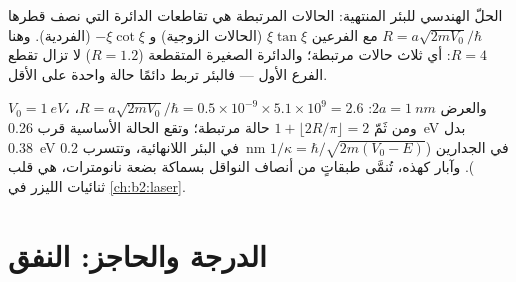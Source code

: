 \begin{omfigure}

{\small الحلّ الهندسي للبئر المنتهية: الحالات المرتبطة هي
تقاطعات الدائرة التي نصف قطرها $R = a\sqrt{2mV_0}/\hbar$ مع
الفرعين $\xi\tan\xi$ (الحالات الزوجية) و $-\xi\cot\xi$ (الفردية). وهنا
$R = 4$: أي ثلاث حالات مرتبطة؛ والدائرة الصغيرة المتقطعة ($R = 1.2$) لا تزال
تقطع الفرع الأول --- فالبئر تربط دائمًا حالة واحدة على الأقل.}
\end{omfigure}

\begin{example}\label{ex:b2:potential-wells-tunneling:finite}
$V_0 = \qty{1}{eV}$، والعرض $2a = \qty{1}{nm}$: $R = a\sqrt{2mV_0}/\hbar = 0.5 \times
10^{-9} \times 5.1 \times 10^9 = 2.6$، ومن ثَمّ $1 + \lfloor 2R/\pi\rfloor = 2$ حالة
مرتبطة؛ وتقع الحالة الأساسية قرب \qty{0.26}{eV} بدل \qty{0.38}{eV}
في البئر اللانهائية، وتتسرب \qty{0.2}{nm} في الجدارين
($1/\kappa = \hbar/\sqrt{2m(V_0 - E)}$). وآبار كهذه، تُنمَّى طبقاتٍ من
أنصاف النواقل بسماكة بضعة نانومترات، هي قلب
ثنائيات الليزر في \cref{ch:b2:laser}.
\end{example}

\section{الدرجة والحاجز: النفق}


